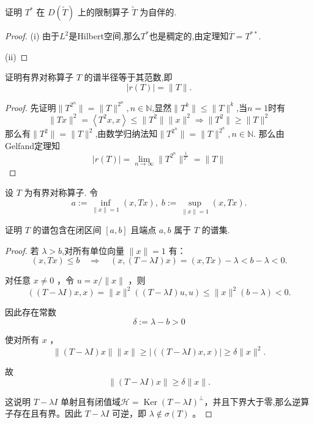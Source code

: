\documentclass[lang=cn,newtx,10pt,scheme=chinese,thmcnt=chapter]{elegantbook}
\newcommand{\Ker}{\operatorname{Ker}}
\begin{document}
\begin{problemset}
证明 \({T}^{ * }\) 在 \(D\left( \widetilde{T}\right)\) 上的限制算子 \(\widetilde{T}\) 为自伴的.

\begin{proof}
   (i) 由于$L^2$是Hilbert空间,那么$T^*$也是稠定的,由定理知$\overline{T}=T^{**}$.

   (ii)
\end{proof}\item 证明有界对称算子 \(T\) 的谱半径等于其范数,即
\begin{equation*}
\left| {r\left( T\right) }\right|  = \parallel T\parallel .
\end{equation*}
\begin{proof}
    先证明$\|T^{2^n}\|=\|T\|^{2^n},n\in \mathbb{N}$,显然$\|T^k\|\leqslant \|T\|^k$,当$n=1$时有
    \[\|Tx\|^2=\left\langle T^2x,x\right\rangle\leqslant \|T^2\|\|x\|^2\Rightarrow \|T^2\|\geqslant\|T\|^2\]
    那么有$\|T^2\|=\|T\|^2$,由数学归纳法知$\|T^{2^n}\|=\|T\|^{2^n},n\in \mathbb{N}$.
    那么由Gelfand定理知\[|r(T)|=\lim\limits_{n\to \infty}\|T^{2^n}\|^{\frac{1}{2^n}}=\|T\|\]
    
\end{proof}
\item  设 \(T\) 为有界对称算子. 令
\begin{equation*}
a \mathrel{\text{ := }} \mathop{\inf }\limits_{{\parallel x\parallel  = 1}}\left( {x,{Tx}}\right) ,\;b \mathrel{\text{ := }} \mathop{\sup }\limits_{{\parallel x\parallel  = 1}}\left( {x,{Tx}}\right) .
\end{equation*}

证明 \(T\) 的谱包含在闭区间 \(\left\lbrack  {a,b}\right\rbrack\) 且端点 \(a,b\) 属于 \(T\) 的谱集.
\begin{proof}
    若 $\lambda>b$,对所有单位向量 $\|x\|=1$ 有：
$$
(x, T x) \leq b \quad \Rightarrow \quad(x,(T-\lambda I) x)=(x, T x)-\lambda<b-\lambda<0 .
$$

对任意 $x \neq 0$ ，令 $u=x /\|x\|$ ，则
$$
((T-\lambda I) x, x)=\|x\|^2((T-\lambda I) u, u) \leq\|x\|^2(b-\lambda)<0 .
$$

因此存在常数
$$
\delta:=\lambda-b>0
$$

使对所有 $x$ ，
$$
\|(T-\lambda I) x\|\|x\| \geq|((T-\lambda I) x, x)| \geq \delta\|x\|^2 .
$$

故
$$
\|(T-\lambda I) x\| \geq \delta\|x\| .
$$


这说明 $T-\lambda I$ 单射且有闭值域$\mathcal{H}=\Ker (T-\lambda I)^\perp$，并且下界大于零,那么逆算子存在且有界。因此 $T-\lambda I$ 可逆，即 $\lambda \notin \sigma(T)$ 。


\end{proof}
\end{problemset}
\end{document}
